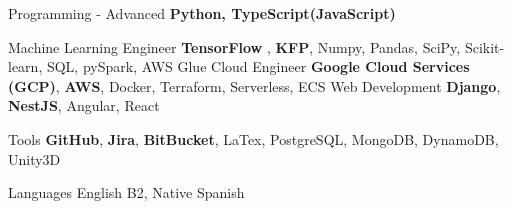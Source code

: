 \cvskill
{Programming - Advanced} %
{\textbf{Python, TypeScript(JavaScript)}} %

\cvskill
{Machine Learning Engineer}
{\textbf{TensorFlow} , \textbf{KFP}, Numpy, Pandas, SciPy, Scikit-learn, SQL, pySpark, AWS Glue}
\cvskill
{Cloud Engineer}
{\textbf{Google Cloud Services (GCP)}, \textbf{AWS}, Docker, Terraform, Serverless, ECS}
\cvskill
{Web Development} %
{\textbf{Django}, \textbf{NestJS}, Angular, React} %

\cvskill
{Tools}
{\textbf{GitHub}, \textbf{Jira}, \textbf{BitBucket}, LaTex, PostgreSQL, MongoDB, DynamoDB, Unity3D}

\cvskill
{Languages} %
{English B2, Native Spanish} %

